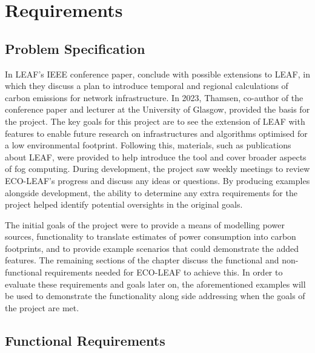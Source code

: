 \documentclass{l4proj}
\begin{document}
\chapter{Requirements}\label{ch:analysis/requirements}

\section{Problem Specification}
In LEAF's IEEE conference paper, \cite{leaf2021} conclude with possible extensions to LEAF, in which they discuss a plan to introduce temporal and regional calculations of carbon emissions for network infrastructure.
In 2023, Thamsen, co-author of the conference paper and lecturer at the University of Glasgow, provided the basis for the project.
The key goals for this project are to see the extension of LEAF with features to enable future research on infrastructures and algorithms optimised for a low environmental footprint.
Following this, materials, such as publications about LEAF, were provided to help introduce the tool and cover broader aspects of fog computing.
During development, the project saw weekly meetings to review ECO-LEAF's progress and discuss any ideas or questions.
By producing examples alongside development, the ability to determine any extra requirements for the project helped identify potential oversights in the original goals.

The initial goals of the project were to provide a means of modelling power sources, functionality to translate estimates of power consumption into carbon footprints, and to provide example scenarios that could demonstrate the added features.
The remaining sections of the chapter discuss the functional and non-functional requirements needed for ECO-LEAF to achieve this.
In order to evaluate these requirements and goals later on, the aforementioned examples will be used to demonstrate the functionality along side addressing when the goals of the project are met.
%
\section{Functional Requirements}
\end{document}

